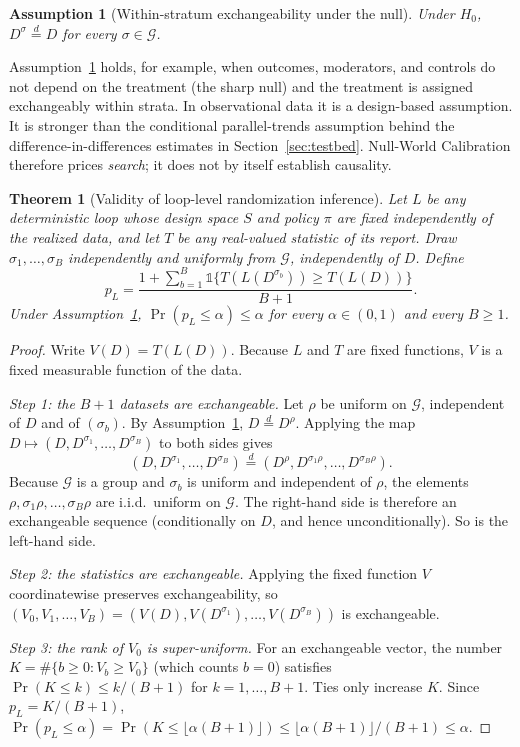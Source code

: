 \documentclass[11pt]{article}
\newtheorem{theorem}{Theorem}\newtheorem{corollary}{Corollary}\newtheorem{assumption}{Assumption}
\theoremstyle{remark}\newtheorem{remark}{Remark}
\begin{document}
\begin{assumption}[Within-stratum exchangeability under the null]\label{ass:exch}
Under $H_0$, $D^{\sigma}\overset{d}{=}D$ for every $\sigma\in\mathcal G$.
\end{assumption}

Assumption~\ref{ass:exch} holds, for example, when outcomes, moderators, and controls do not depend on the treatment (the
sharp null) and the treatment is assigned exchangeably within strata. In observational data it is a design-based
assumption. It is stronger than the conditional parallel-trends assumption behind the difference-in-differences estimates
in Section~\ref{sec:testbed}. Null-World Calibration therefore prices \emph{search}; it does not by itself establish
causality.

\begin{theorem}[Validity of loop-level randomization inference]\label{thm:valid}
Let $L$ be any deterministic loop whose design space $S$ and policy $\pi$ are fixed independently of the realized data,
and let $T$ be any real-valued statistic of its report. Draw $\sigma_1,\dots,\sigma_B$ independently and uniformly from
$\mathcal G$, independently of $D$. Define
\[
p_L=\frac{1+\sum_{b=1}^{B}\mathbb 1\{T(L(D^{\sigma_b}))\ge T(L(D))\}}{B+1}.
\]
Under Assumption~\ref{ass:exch}, $\Pr(p_L\le\alpha)\le\alpha$ for every $\alpha\in(0,1)$ and every $B\ge1$.
\end{theorem}

\begin{proof}
Write $V(D)=T(L(D))$. Because $L$ and $T$ are fixed functions, $V$ is a fixed measurable function of the data.

\emph{Step 1: the $B+1$ datasets are exchangeable.} Let $\rho$ be uniform on $\mathcal G$, independent of $D$ and of
$(\sigma_b)$. By Assumption~\ref{ass:exch}, $D\overset{d}{=}D^{\rho}$. Applying the map
$D\mapsto(D,D^{\sigma_1},\dots,D^{\sigma_B})$ to both sides gives
\[
(D,D^{\sigma_1},\dots,D^{\sigma_B})\overset{d}{=}(D^{\rho},D^{\sigma_1\rho},\dots,D^{\sigma_B\rho}).
\]
Because $\mathcal G$ is a group and $\sigma_b$ is uniform and independent of $\rho$, the elements
$\rho,\sigma_1\rho,\dots,\sigma_B\rho$ are i.i.d.\ uniform on $\mathcal G$. The right-hand side is therefore an
exchangeable sequence (conditionally on $D$, and hence unconditionally). So is the left-hand side.

\emph{Step 2: the statistics are exchangeable.} Applying the fixed function $V$ coordinatewise preserves exchangeability,
so $(V_0,V_1,\dots,V_B)=(V(D),V(D^{\sigma_1}),\dots,V(D^{\sigma_B}))$ is exchangeable.

\emph{Step 3: the rank of $V_0$ is super-uniform.} For an exchangeable vector, the number $K=\#\{b\ge0: V_b\ge V_0\}$
(which counts $b=0$) satisfies $\Pr(K\le k)\le k/(B+1)$ for $k=1,\dots,B+1$. Ties only increase $K$. Since $p_L=K/(B+1)$,
$\Pr(p_L\le\alpha)=\Pr(K\le\lfloor\alpha(B+1)\rfloor)\le\lfloor\alpha(B+1)\rfloor/(B+1)\le\alpha$.
\end{proof}
\end{document}

